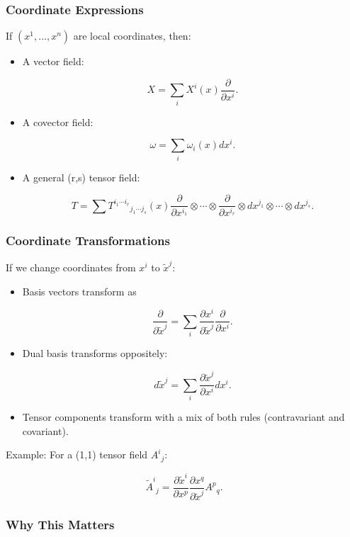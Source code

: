 \documentclass[
  letterpaper,
  DIV=11,
  numbers=noendperiod]{scrreprt}
\begin{document}
\subsubsection{Coordinate Expressions}\label{coordinate-expressions}

If \((x^1,\dots,x^n)\) are local coordinates, then:

\begin{itemize}
\item
  A vector field:

  \[
  X = \sum_i X^i(x) \frac{\partial}{\partial x^i}.
  \]
\item
  A covector field:

  \[
  \omega = \sum_i \omega_i(x) dx^i.
  \]
\item
  A general (r,s) tensor field:

  \[
  T = \sum T^{i_1 \cdots i_r}{}_{j_1 \cdots j_s}(x)
  \frac{\partial}{\partial x^{i_1}} \otimes \cdots \otimes \frac{\partial}{\partial x^{i_r}}
  \otimes dx^{j_1} \otimes \cdots \otimes dx^{j_s}.
  \]
\end{itemize}

\subsubsection{Coordinate
Transformations}\label{coordinate-transformations}

If we change coordinates from \(x^i\) to \(\tilde{x}^j\):

\begin{itemize}
\item
  Basis vectors transform as

  \[
  \frac{\partial}{\partial \tilde{x}^j} = \sum_i \frac{\partial x^i}{\partial \tilde{x}^j} \frac{\partial}{\partial x^i}.
  \]
\item
  Dual basis transforms oppositely:

  \[
  d\tilde{x}^j = \sum_i \frac{\partial \tilde{x}^j}{\partial x^i} dx^i.
  \]
\item
  Tensor components transform with a mix of both rules (contravariant
  and covariant).
\end{itemize}

Example: For a (1,1) tensor field \(A^i{}_j\):

\[
\tilde{A}^i{}_j =
\frac{\partial \tilde{x}^i}{\partial x^p}
\frac{\partial x^q}{\partial \tilde{x}^j}
A^p{}_q.
\]

\subsubsection{Why This Matters}\label{why-this-matters-56}
\end{document}
